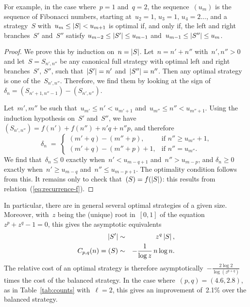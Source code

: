 For example, in the case where~$p = 1$ and~$q = 2$, the sequence~$(u_m)$
is the sequence of Fibonacci numbers, starting at~$u_2 = 1$, $u_3 = 1$,
$u_4 = 2$..., and a strategy~$S$ with~$u_{m} \leq \left|S\right| < u_{m+1}$ is
optimal if, and only if, the left and right branches~$S'$ and~$S''$
satisfy $u_{m-2} \leq \left|S'\right| \leq u_{m-1}$ and~$u_{m-1} \leq \left|S''\right| \leq
u_m$.

\begin{proof}
We prove this by induction on~$n = \left|S\right|$. Let~$n = n' + n''$ with~$n',
n'' > 0$ and let~$S = S_{n',n''}$ be any canonical full strategy with optimal
left and right branches~$S'$, $S''$, such that~$\left|S'\right| = n'$
and~$\left|S''\right| = n''$. Then any optimal strategy is one of
the~$S_{n',n''}$. Therefore, we find them by looking at the sign
of~$\delta_n = (S_{n'+1,n''-1}) - (S_{n',n''})$.

Let~$m',m''$ be such that~$u_{m'} \leq n' < u_{m' + 1}$ and~$u_{m''} \leq
n'' < u_{m''+1}$. Using the induction hypothesis on~$S'$ and~$S''$, we
have $(S_{n',n''}) = f(n') + f(n'')  + n' q + n'' p$, and therefore
\begin{equation}
\delta_n \;=\; \begin{cases}
(m' + q) - (m'' + p),& \text{if $n'' \geq u_{m''} + 1$,}\\
(m' + q) - (m'' + p) + 1, &\text{if $n'' = u_{m''}$.}
\end{cases}
\end{equation}
We find that~$\delta_n \leq 0$ exactly when~$n' < u_{m-q+1}$ and~$n'' >
u_{m-p}$, and $\delta_n \geq 0$ exactly when~$n' \geq u_{m-q}$ and~$n''
\leq u_{m-p+1}$. The optimality condition follows from this.
It remains only to check that~$(S) = f(\left|S\right|)$: this results from
relation~(\ref{eq:recurrence-f}).
\end{proof}

In particular, there are in general several optimal strategies of a given
size. Moreover, with~$z$ being the (unique) root in~$[0,1]$ of the
equation~$z^p + z^q - 1 = 0$, this gives the asymptotic equivalents
\begin{eqnarray}
\left|S'\right| &\sim& z^q \left|S\right|,\\
C_{p,q}(n) = (S) &\sim& -\frac{1}{\log z}\, n \log n.
\end{eqnarray}
The relative cost of an optimal strategy is therefore
asymptotically~$-\frac{2 \log 2}{\log (z^{p+q})}$ times the cost of
the balanced strategy. In the case where~$(p, q) = (4.6, 2.8)$, as in
Table~\ref{tab:counts} with~$\ell = 2$, this gives an improvement
of~2.1\% over the balanced strategy.


